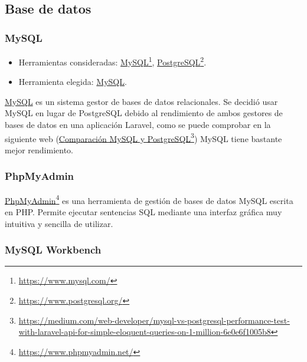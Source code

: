 \subsection{Base de datos}

\subsubsection{MySQL}
\begin{itemize}
    \item Herramientas consideradas: \href{https://www.mysql.com/}{MySQL}\footnote{\label{mysqlfoot}\href{https://www.mysql.com/}{https://www.mysql.com/}},
    \href{https://www.postgresql.org/}{PostgreSQL}\footnote{\href{https://www.postgresql.org/}{https://www.postgresql.org/}}.
	\item Herramienta elegida: \href{https://www.mysql.com/}{MySQL}.
\end{itemize}

\href{https://www.mysql.com/}{MySQL} es un sistema gestor de bases de datos relacionales. Se decidió usar MySQL en lugar de PostgreSQL debido al rendimiento de ambos gestores de bases de datos en una aplicación Laravel, como se puede comprobar en la siguiente web (\href{https://medium.com/web-developer/mysql-vs-postgresql-performance-test-with-laravel-api-for-simple-eloquent-queries-on-1-million-6e0e6f1005b8}{Comparación MySQL y PostgreSQL}\footnote{\href{https://medium.com/web-developer/mysql-vs-postgresql-performance-test-with-laravel-api-for-simple-eloquent-queries-on-1-million-6e0e6f1005b8}{https://medium.com/web-developer/mysql-vs-postgresql-performance-test-with-laravel-api-for-simple-eloquent-queries-on-1-million-6e0e6f1005b8}}) MySQL tiene bastante mejor rendimiento.

\subsubsection{PhpMyAdmin}

\href{https://www.phpmyadmin.net/}{PhpMyAdmin}\footnote{\href{https://www.phpmyadmin.net/}{https://www.phpmyadmin.net/}} es una herramienta de gestión de bases de datos MySQL escrita en PHP. Permite ejecutar sentencias SQL mediante una interfaz gráfica muy intuitiva y sencilla de utilizar.


\subsubsection{MySQL Workbench}

